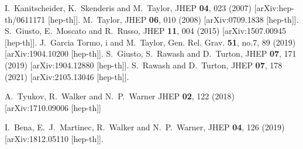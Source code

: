 \documentclass[11pt]{article}
\begin{document}
\begin{thebibliography}{99}
I.~Kanitscheider, K.~Skenderis and M.~Taylor,
JHEP \textbf{04}, 023 (2007)
[arXiv:hep-th/0611171 [hep-th]].
M.~Taylor,
JHEP \textbf{06}, 010 (2008)
[arXiv:0709.1838 [hep-th]].
S.~Giusto, E.~Moscato and R.~Russo,
JHEP \textbf{11}, 004 (2015)
[arXiv:1507.00945 [hep-th]].
J.~Garcia Tormo, i and M.~Taylor,
Gen. Rel. Grav. \textbf{51}, no.7, 89 (2019)
[arXiv:1904.10200 [hep-th]].
S.~Giusto, S.~Rawash and D.~Turton,
JHEP \textbf{07}, 171 (2019)
[arXiv:1904.12880 [hep-th]].
S.~Rawash and D.~Turton,
JHEP \textbf{07}, 178 (2021)
[arXiv:2105.13046 [hep-th]].

A.~Tyukov, R.~Walker and N.~P.~Warner
JHEP \textbf{02}, 122 (2018)
[arXiv:1710.09006 [hep-th]]

I.~Bena, E.~J.~Martinec, R.~Walker and N.~P.~Warner,
JHEP \textbf{04}, 126 (2019)
[arXiv:1812.05110 [hep-th]].


\end{thebibliography}
\end{document}
